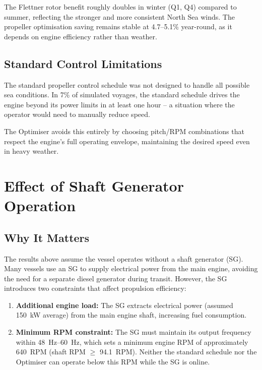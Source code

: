 \documentclass[a4paper,11pt]{article}
\begin{document}
The Flettner rotor benefit roughly doubles in winter (Q1, Q4) compared to
summer, reflecting the stronger and more consistent North Sea winds.  The
propeller optimisation saving remains stable at 4.7--5.1\% year-round,
as it depends on engine efficiency rather than weather.

\subsection{Standard Control Limitations}
\label{sec:orga013de4}

The standard propeller control schedule was not designed to handle all possible
sea conditions.  In 7\% of simulated voyages, the standard schedule
drives the engine beyond its power limits in at least one hour -- a situation
where the operator would need to manually reduce speed.

The Optimiser avoids this entirely by choosing pitch/RPM
combinations that respect the engine's full operating envelope, maintaining the
desired speed even in heavy weather.

\section{Effect of Shaft Generator Operation}
\label{sec:org5be03cc}
\subsection{Why It Matters}
\label{sec:orgb282837}

The results above assume the vessel operates without a shaft generator (SG).
Many vessels use an SG to supply electrical power from the main engine, avoiding
the need for a separate diesel generator during transit.  However, the SG
introduces two constraints that affect propulsion efficiency:

\begin{enumerate}
\item \textbf{Additional engine load:} The SG extracts electrical power (assumed
\SI{150}{\kilo\watt} average) from the main engine shaft, increasing fuel
consumption.

\item \textbf{Minimum RPM constraint:} The SG must maintain its output frequency within
\SIrange{48}{60}{\hertz}, which sets a minimum engine RPM of approximately
\SI{640}{RPM} (shaft RPM \(\geq\) \SI{94.1}{RPM}).  Neither the standard
schedule nor the Optimiser can operate below this RPM while the SG is online.
\end{enumerate}
\end{document}
